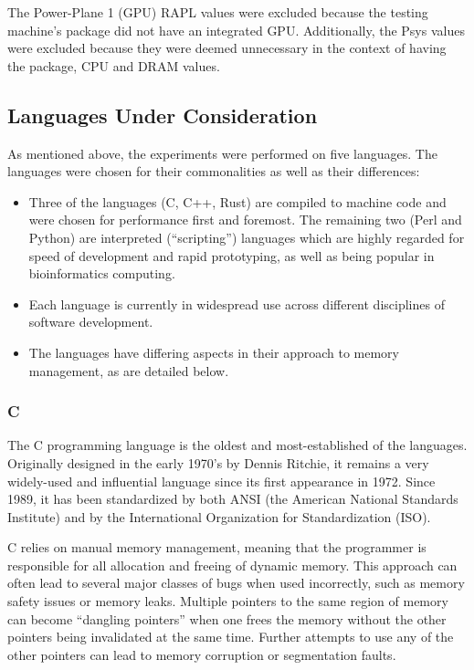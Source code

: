 The Power-Plane 1 (GPU) RAPL values were excluded because the testing machine's package did not have an integrated GPU. Additionally, the Psys values were excluded because they were deemed unnecessary in the context of having the package, CPU and DRAM values.

\subsection{Languages Under Consideration}

As mentioned above, the experiments were performed on five languages. The languages were chosen for their commonalities as well as their differences:

\begin{itemize}
\item Three of the languages (C, C++, Rust) are compiled to machine code and were chosen for performance first and foremost. The remaining two (Perl and Python) are interpreted (``scripting'') languages which are highly regarded for speed of development and rapid prototyping, as well as being popular in bioinformatics computing.
\item Each language is currently in widespread use across different disciplines of software development.
\item The languages have differing aspects in their approach to memory management, as are detailed below.
\end{itemize}

\subsubsection{C}

The C programming language is the oldest and most-established of the languages. Originally designed in the early 1970's by Dennis Ritchie, it remains a very widely-used and influential language since its first appearance in 1972. Since 1989, it has been standardized by both ANSI (the American National Standards Institute) and by the International Organization for Standardization (ISO).

C relies on manual memory management, meaning that the programmer is responsible for all allocation and freeing of dynamic memory. This approach can often lead to several major classes of bugs when used incorrectly, such as memory safety issues or memory leaks. Multiple pointers to the same region of memory can become ``dangling pointers'' when one frees the memory without the other pointers being invalidated at the same time. Further attempts to use any of the other pointers can lead to memory corruption or segmentation faults.

